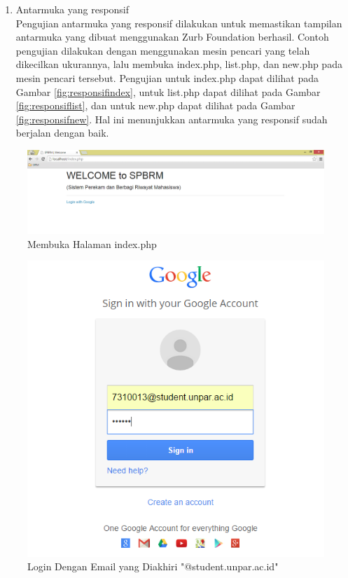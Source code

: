 \begin{enumerate}[(1)]
\item Antarmuka yang responsif\\
    Pengujian antarmuka yang responsif dilakukan untuk memastikan tampilan antarmuka yang dibuat menggunakan Zurb Foundation berhasil. Contoh pengujian dilakukan dengan menggunakan mesin pencari yang telah dikecilkan ukurannya, lalu membuka index.php, list.php, dan new.php pada mesin pencari tersebut. Pengujian untuk index.php dapat dilihat pada Gambar \ref{fig:responsifindex}, untuk list.php dapat dilihat pada Gambar \ref{fig:responsiflist}, dan untuk new.php dapat dilihat pada Gambar \ref{fig:responsifnew}. Hal ini menunjukkan antarmuka yang responsif sudah berjalan dengan baik.
\end{enumerate}

\begin{figure}[H]
\centering
\includegraphics[scale=0.4]{Gambar/pengujian1.png}
\caption[Membuka Halaman index.php]{Membuka Halaman index.php} 
\label{fig:membukahalamanindex}
\end{figure}

\begin{figure}[H]
\centering
\includegraphics[scale=0.5]{Gambar/pengujian2.png}
\caption[Login Dengan Email yang Diakhiri "@student.unpar.ac.id"]{Login Dengan
Email yang Diakhiri "@student.unpar.ac.id"}
\label{fig:logindenganstudent}
\end{figure}

